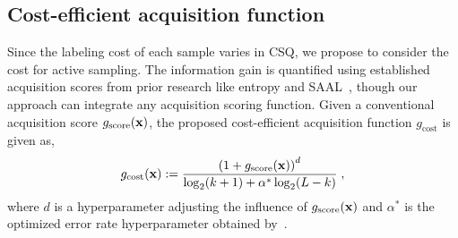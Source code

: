\subsection{Cost-efficient acquisition function}
\label{sec:acquisition}
Since the labeling cost of each sample varies in CSQ, we propose to consider the cost for active sampling.
The information gain is quantified using established acquisition scores from prior research like entropy and SAAL~\citep{kim2023saal}, though our approach can integrate any acquisition scoring function.
Given a conventional acquisition score $g_\text{score}(\mathbf{x})$, the proposed cost-efficient acquisition function $g_\text{cost}$ is given as,
\begin{equation}
        g_\text{cost}(\mathbf{x}) := \frac{\left(1 + g_\text{score}(\mathbf{x})\right)^d}
        {\log_2 (k + 1) + \alpha^* \log_2 (L-k)} \;,
        \label{eq:acquisition}
\end{equation}
where $d$ is a hyperparameter adjusting the influence of $g_\text{score}(\mathbf{x})$ and $\alpha^*$ is the optimized error rate hyperparameter obtained by~.


            



